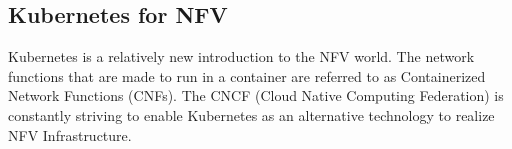\subsection{Kubernetes for NFV}
	
\begin{flushleft}
Kubernetes is a relatively new introduction to the NFV world. The network functions that are made to run in a container are referred to as Containerized Network Functions (CNFs). The CNCF (Cloud Native Computing Federation) is constantly striving to enable Kubernetes as an alternative technology to realize NFV Infrastructure.
\end{flushleft}

